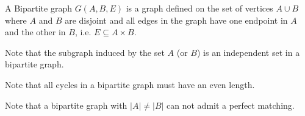 \begin{definition}
	A Bipartite graph $G(A,B,E)$ is a graph defined on the set of vertices $A \cup B$ where $A$ and $B$ are disjoint and all edges in the graph have one endpoint in $A$ and the other in $B$, i.e. $E \subseteq A \times B$.
\end{definition}
Note that the subgraph induced by the set $A$ (or $B$) is an independent set in a bipartite graph.

Note that all cycles in a bipartite graph must have an even length.

Note that a bipartite graph with $|A| \neq |B|$ can not admit a perfect matching.

